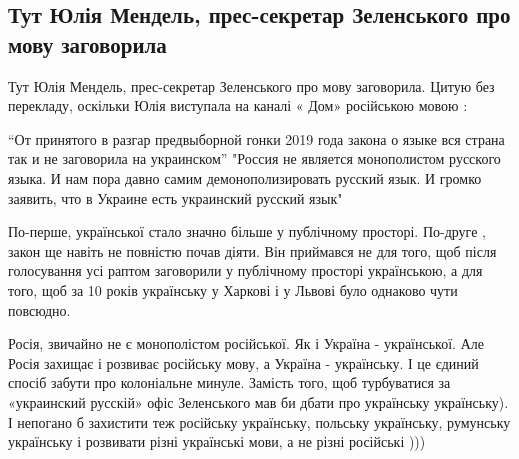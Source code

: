  
 
 
 
 

\subsection{Тут Юлія Мендель, прес-секретар Зеленського про мову заговорила}

Тут Юлія Мендель, прес-секретар Зеленського про мову заговорила. Цитую без
перекладу, оскільки Юлія виступала на каналі « Дом» російською мовою : 

“От принятого в разгар предвыборной гонки 2019 года закона о языке вся страна
так и не заговорила на украинском” "Россия не является монополистом русского
языка. И нам пора давно самим демонополизировать русский язык. И громко
заявить, что в Украине есть украинский русский язык"

По-перше, української стало значно більше у публічному просторі. По-друге ,
закон ще навіть не повністю почав діяти. Він приймався не для того, щоб після
голосування усі раптом заговорили у публічному просторі українською, а для
того, щоб за 10 років українську у Харкові і у Львові було однаково чути
повсюдно. 

Росія, звичайно не є монополістом російської. Як і Україна - української. Але
Росія захищає і розвиває російську мову, а Україна - українську. І це єдиний
спосіб забути про колоніальне минуле. Замість того, щоб турбуватися за
«украинский русскій» офіс Зеленського мав би дбати про українську українську).
І непогано б захистити теж російську українську, польську українську, румунську
українську і розвивати різні українські мови, а не різні російські )))
